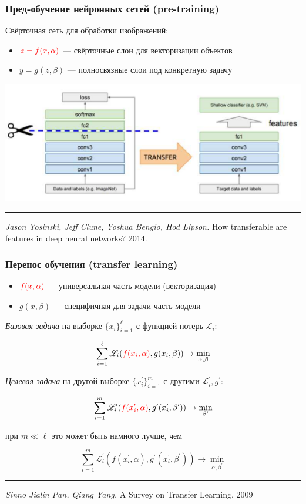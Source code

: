 \documentclass[fullscreen=true, bookmarks=true, hyperref={pdfencoding=unicode}]{beamer}
\begin{document}
\begin{frame}
  \frametitle{Пред-обучение нейронных сетей (pre-training)}

  Свёрточная сеть для обработки изображений:

  \begin{itemize}
    \item $\color{red}{z=f(x,\alpha)}$ — свёрточные слои для векторизации объектов
    \item $y = g(z, \beta)$ — полносвязные слои под конкретную задачу
  \end{itemize}

  \begin{center}
    \includegraphics[keepaspectratio,
                   width=.8\paperwidth]{pre-training.png}
  \end{center}

  \noindent\rule{8cm}{0.4pt}

  {\small
  {\it Jason Yosinski, Jeff Clune, Yoshua Bengio, Hod Lipson.} How transferable are features in deep neural networks? 2014.}
\end{frame}


\begin{frame}
  \frametitle{Перенос обучения (transfer learning)}

  \begin{itemize}
    \item ${\color{red}f(x,\alpha)}$ — универсальная часть модели (векторизация)
    \item $g(x, \beta)$ — специфичная для задачи часть модели
  \end{itemize}

  {\it Базовая задача} на выборке $\{x_i\}_{i=1}^\ell$ с функцией потерь $\mathscr{L}_i$:

  $$\sum\limits_{i=1}^\ell \mathscr{L}_i ({\color{red}f(x_i,\alpha)}, g(x_i, \beta)) \to \min_{\alpha, \beta} $$

  {\it Целевая задача} на другой выборке $\{x_i^\prime\}_{i=1}^m$ с другими $\mathscr{L}_i^\prime, g^\prime$:

  $$\sum\limits_{i=1}^m \mathscr{L}_i^\prime ({\color{red}f(x_i^\prime,\alpha)}, g^\prime(x_i^\prime, \beta^\prime)) \to \min_{ \beta^\prime} $$

  при $m \ll \ell$ это может быть намного лучше, чем

  $$\sum\limits_{i=1}^m \mathscr{L}_i^\prime (f(x_i^\prime,\alpha), g^\prime(x_i^\prime, \beta^\prime)) \to \min_{\alpha, \beta^\prime} $$

  \noindent\rule{8cm}{0.4pt}

  {\small
  {\it Sinno Jialin Pan, Qiang Yang.} A Survey on Transfer Learning. 2009}
\end{frame}
\end{document}
